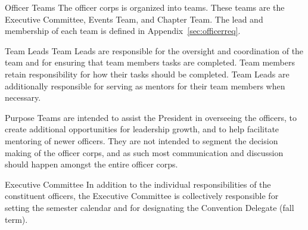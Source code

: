 \begin{enumsubsection}
\begin{enumsubsubsection}
\begin{enumerate}
\end{enumerate}
 \end{enumsubsubsection}
\item{Officer Teams}\label{sec:OfficerTeams}
The officer corps is organized into teams.
These teams are the Executive Committee, Events Team, and Chapter Team.
The lead and membership of each team is defined in Appendix~\ref{sec:officerreq}.

\begin{enumsubsubsection}
\item{Team Leads}
Team Leads are responsible for the oversight and coordination of the team and for ensuring that team members tasks are completed.
Team members retain responsibility for how their tasks should be completed.
Team Leads are additionally responsible for serving as mentors for their team members when necessary.
\item{Purpose}
Teams are intended to assist the President in overseeing the officers, to create additional opportunities for leadership growth, and to help facilitate mentoring of newer officers.
They are not intended to segment the decision making of the officer corps, and as such most communication and discussion should happen amongst the entire officer corps.
\item{Executive Committee}
In addition to the individual responsibilities of the constituent officers, the Executive Committee is collectively responsible for setting the semester calendar and for designating the Convention Delegate (fall term).
\end{enumsubsubsection}
\end{enumsubsection}

